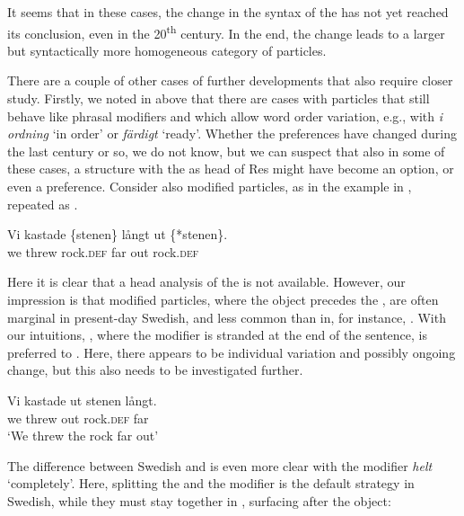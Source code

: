 \documentclass[output=paper]{langscibook}
\begin{document}
It seems that in these cases, the change in the syntax of the  has not yet reached its conclusion, even in the 20\textsuperscript{th} century. In the end, the change leads to a larger but syntactically more homogeneous category of particles. 



There are a couple of other cases of further developments that also require closer study. Firstly, we noted in  above that there are cases with particles that still behave like phrasal modifiers and which allow word order variation, e.g., with \textit{i ordning} ‘in order’ or \textit{färdigt} ‘ready’. Whether the preferences have changed during the last century or so, we do not know, but we can suspect that also in some of these cases, a structure with the  as head of Res might have become an option, or even a preference. Consider also modified particles, as in the example in , repeated as .\largerpage[-1.5]


\ea\label{ex:lalu:66}
\gll Vi     kastade \{stenen\}       långt    ut   \{*stenen\}.\\
we   threw     rock.\textsc{def}     far     out   rock.\textsc{def}\\
\z\pagebreak


Here it is clear that a head analysis of the  is not available. However, our impression is that modified particles, where the object precedes the , are often marginal in present-day Swedish, and less common than in, for instance, . With our intuitions, , where the modifier is stranded at the end of the sentence, is preferred to . Here, there appears to be individual variation and possibly ongoing change, but this also needs to be investigated further.


\ea\label{ex:lalu:67}
\gll  Vi     kastade   ut     stenen       långt.\\
we   threw     out     rock\textsc{.def}   far \\
\glt `We threw the rock far out'
\z


The difference between Swedish and  is even more clear with the modifier \textit{helt} ‘completely’. Here, splitting the  and the modifier is the default strategy in Swedish, while they must stay together in , surfacing after the object:
\end{document}
